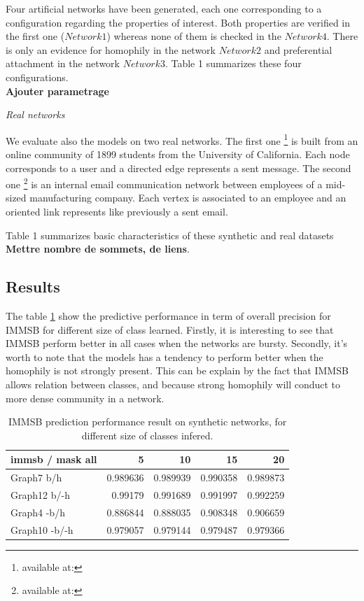 Four artificial networks have been generated, each one corresponding to a configuration  regarding the properties of interest.
Both properties are verified in the first one ($Network1$) whereas none of them is checked in the $Network4$.  There is only an evidence for homophily in the network $Network2$ and  preferential attachment in the network  $Network3$. Table 1 summarizes these four configurations. \\ 

\textbf{Ajouter parametrage}  

\textit{Real networks}

We evaluate also the models on two  real networks.
The first one \footnote{available at:} is built from an online community of 1899 students from the University of California. Each node corresponds to a user and a directed edge represents a sent message. 
The second one \footnote{available at:} is an internal email communication network between employees of a mid-sized manufacturing company. Each vertex is associated to an employee and an oriented link represents like previously a sent email.

Table 1 summarizes basic characteristics of these synthetic and real datasets \textbf{ Mettre nombre de sommets, de liens}.


\subsection{Results}
The table \ref{table:immsb} show the predictive performance in term of overall precision for IMMSB for different size of class learned. Firstly, it is interesting to see that IMMSB perform better in all cases when the networks are bursty. Secondly, it's worth to note that the models has a tendency to perform better when the homophily is not strongly present. This can be explain by the fact that IMMSB allows relation between classes, and because strong homophily will conduct to more dense community in a network.


\begin{table} \label{table:immsb}
\begin{tabular}{lrrrr}
\hline                                                                             
 immsb / mask all   &        5 &       10 &       15 &       20 \\                 
\hline                                                                             
 Graph7 b/h         & 0.989636 & 0.989939 & 0.990358 & 0.989873 \\                 
 Graph12 b/-h       & 0.99179  & 0.991689 & 0.991997 & 0.992259 \\                 
 Graph4 -b/h        & 0.886844 & 0.888035 & 0.908348 & 0.906659 \\                 
 Graph10 -b/-h      & 0.979057 & 0.979144 & 0.979487 & 0.979366 \\                 
\hline                                                                             
\end{tabular}  
    \caption{IMMSB prediction performance result on synthetic networks, for different size of classes infered.}
\end{table}


